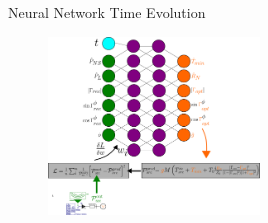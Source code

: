 \documentclass[aspectratio=169]{beamer}
\begin{document}


\begin{frame}{\small{Neural Network Time Evolution}}
    \begin{figure}
        \centering
        \includegraphics[width=0.5\textwidth]{images/nn_time.pdf}
    \end{figure}
\end{frame}
\end{document}
